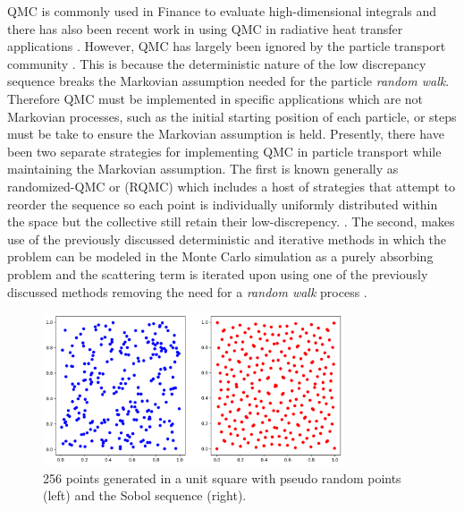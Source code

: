 QMC is commonly used in Finance to evaluate high-dimensional integrals \cite{Dagpunar2007} and there has also been recent work in using QMC in radiative heat transfer applications \cite{MOROKOFF1993, Palluotto2019}. However, QMC has largely been ignored by the particle transport community \cite{Spanier1995}. This is because the deterministic nature of the low discrepancy sequence breaks the Markovian assumption needed for the particle \textit{random walk}. Therefore QMC must be implemented in specific applications which are not Markovian processes, such as the initial starting position of each particle, or steps must be take to ensure the Markovian assumption is held. Presently, there have been two separate strategies for implementing QMC in particle transport while maintaining the Markovian assumption. The first is known generally as randomized-QMC or (RQMC) which includes a host of strategies that attempt to reorder the sequence so each point is individually uniformly distributed within the space but the collective still retain their low-discrepency. \cite{Fox1999, Spanier1995, Farmer2020, MOROKOFF1993, Konzen2019}. The second, makes use of the previously discussed  deterministic and iterative methods in which the problem can be modeled in the Monte Carlo simulation as a purely absorbing problem and the scattering term is iterated upon using one of the previously discussed methods removing the need for a \textit{random walk} process \cite{Pasmann2021}.

\begin{figure}[h]
\centerline{
\includegraphics[width=3.5in]{FIGURES/sobol.png}
}
\caption{\label{fig:sobol} 256 points generated in a unit square with pseudo random points (left) and the Sobol sequence (right).}
\end{figure}

